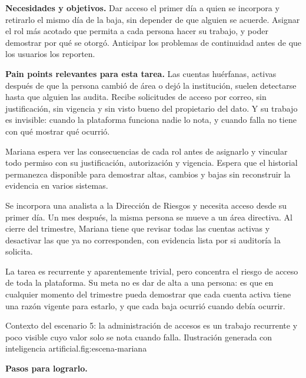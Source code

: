 \textbf{\textcolor{uxnavy}{Necesidades y objetivos.}} Dar acceso el primer día a quien se
incorpora y retirarlo el mismo día de la baja, sin depender de que alguien se acuerde. Asignar
el rol más acotado que permita a cada persona hacer su trabajo, y poder demostrar por qué se
otorgó. Anticipar los problemas de continuidad antes de que los usuarios los reporten.

\textbf{\textcolor{uxnavy}{Pain points relevantes para esta tarea.}} Las cuentas huérfanas,
activas después de que la persona cambió de área o dejó la institución, suelen detectarse
hasta que alguien las audita. Recibe solicitudes de acceso por correo, sin justificación, sin
vigencia y sin visto bueno del propietario del dato. Y su trabajo es invisible: cuando la
plataforma funciona nadie lo nota, y cuando falla no tiene con qué mostrar qué ocurrió.


Mariana espera ver las consecuencias de cada rol antes de asignarlo y vincular todo permiso
con su justificación, autorización y vigencia. Espera que el historial permanezca disponible
para demostrar altas, cambios y bajas sin reconstruir la evidencia en varios sistemas.


Se incorpora una analista a la Dirección de Riesgos y necesita acceso desde su primer día. Un
mes después, la misma persona se mueve a un área directiva. Al cierre del trimestre, Mariana
tiene que revisar todas las cuentas activas y desactivar las que ya no corresponden, con
evidencia lista por si auditoría la solicita.

La tarea es recurrente y aparentemente trivial, pero concentra el riesgo de acceso de toda la
plataforma. Su meta no es dar de alta a una persona: es que en cualquier momento del trimestre
pueda demostrar que cada cuenta activa tiene una razón vigente para estarlo, y que cada baja
ocurrió cuando debía ocurrir.

  {Contexto del escenario 5: la administración de accesos es un trabajo recurrente y poco
   visible cuyo valor solo se nota cuando falla. Ilustración generada con inteligencia
   artificial.}{fig:escena-mariana}

\textbf{\textcolor{uxnavy}{Pasos para lograrlo.}}

